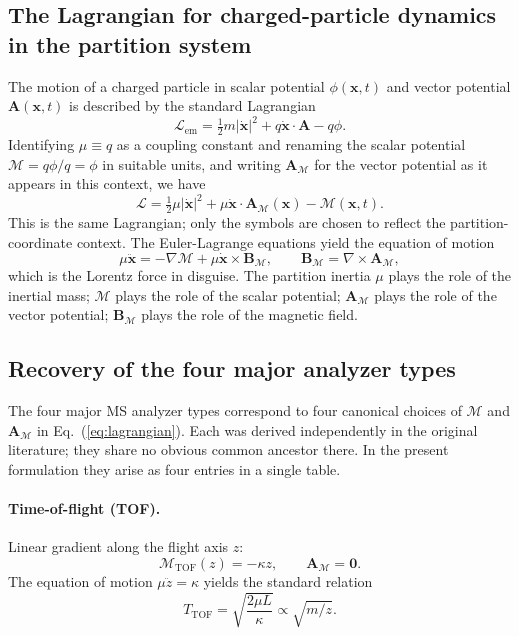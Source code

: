 \documentclass[twocolumn,11pt,a4paper]{article}
\theoremstyle{definition}
\theoremstyle{remark}
\newcommand{\Depth}{\mathcal{M}}
\newcommand{\Lagr}{\mathcal{L}}
\newcommand{\Apartition}{\mathbf{A}_{\mathcal{M}}}
\newcommand{\Bpartition}{\mathbf{B}_{\mathcal{M}}}
\newcommand{\partinert}{\mu}
\begin{document}
\subsection{The Lagrangian for charged-particle dynamics in the partition system}

The motion of a charged particle in scalar potential $\phi(\mathbf{x}, t)$ and vector potential $\mathbf{A}(\mathbf{x}, t)$ is described by the standard Lagrangian \citep{landau1976,goldstein2002,jackson1999}
\begin{equation}
    \Lagr_{\mathrm{em}} = \tfrac{1}{2} m |\dot{\mathbf{x}}|^2 + q\dot{\mathbf{x}} \cdot \mathbf{A} - q\phi.
\end{equation}
Identifying $\partinert \equiv q$ as a coupling constant and renaming the scalar potential $\Depth = q\phi/q = \phi$ in suitable units, and writing $\Apartition$ for the vector potential as it appears in this context, we have
\begin{equation}
\boxed{
    \Lagr = \tfrac{1}{2}\partinert |\dot{\mathbf{x}}|^2 + \partinert \dot{\mathbf{x}} \cdot \Apartition(\mathbf{x}) - \Depth(\mathbf{x}, t).
}
\label{eq:lagrangian}
\end{equation}
This is the same Lagrangian; only the symbols are chosen to reflect the partition-coordinate context. The Euler-Lagrange equations yield the equation of motion
\begin{equation}
    \partinert \ddot{\mathbf{x}} = -\nabla \Depth + \partinert \dot{\mathbf{x}} \times \Bpartition,
    \qquad \Bpartition = \nabla \times \Apartition,
\label{eq:eom}
\end{equation}
which is the Lorentz force in disguise. The partition inertia $\partinert$ plays the role of the inertial mass; $\Depth$ plays the role of the scalar potential; $\Apartition$ plays the role of the vector potential; $\Bpartition$ plays the role of the magnetic field.

\subsection{Recovery of the four major analyzer types}

The four major MS analyzer types correspond to four canonical choices of $\Depth$ and $\Apartition$ in Eq.~(\ref{eq:lagrangian}). Each was derived independently in the original literature; they share no obvious common ancestor there. In the present formulation they arise as four entries in a single table.

\paragraph{Time-of-flight (TOF).} Linear gradient along the flight axis $z$:
\begin{equation}
    \Depth_{\mathrm{TOF}}(z) = -\kappa z, \qquad \Apartition = \mathbf{0}.
\end{equation}
The equation of motion $\partinert \ddot{z} = \kappa$ yields the standard relation \citep{wiley1955,cotter1992}
\begin{equation}
    T_{\mathrm{TOF}} = \sqrt{\frac{2\partinert L}{\kappa}} \propto \sqrt{m/z}.
\end{equation}
\end{document}
